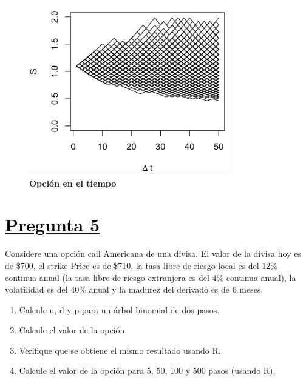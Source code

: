 \documentclass[12pt]{article}
\newcommand{\subrayadoRojo}[1]{{\color{rojoudp}\underline{\textcolor{black}{#1}}}}
\begin{document}
\begin{figure}[H]
    \centering
    \includegraphics[height=20em]{../imagenes/Imagen 1.png}
    \caption{\textbf{Opción en el tiempo}}
\end{figure}

\section*{\subrayadoRojo{Pregunta 5}}
Considere una opción call Americana de una divisa. El valor de la divisa hoy es de \$700, 
el strike Price es de \$710, la tasa libre de riesgo local es del 12\% continua anual 
(la tasa libre de riesgo extranjera es del 4\% continua anual), la volatilidad es del 
40\% anual y la madurez del derivado es de 6 meses. 
    \begin{enumerate}[label=\textbf{\alph*)}]
        \item 	Calcule u, d y p para un árbol binomial de dos pasos. 
        \item   Calcule el valor de la opción.
        \item   Verifique que se obtiene el mismo resultado usando R.
        \item   Calcule el valor de la opción para 5, 50, 100 y 500 pasos (usando R).
    
    \end{enumerate}
\end{document}

